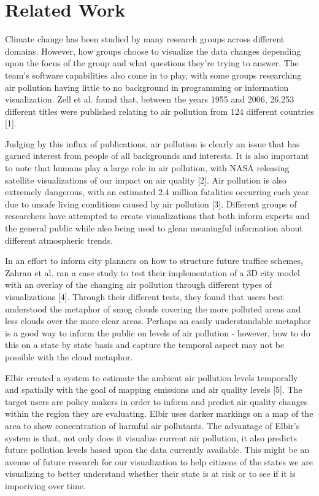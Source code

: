 \documentclass[journal]{vgtc}                %
\begin{document}
\section{Related Work}

Climate change has been studied by many research groups across different domains. However, how groups choose to visualize
the data changes depending upon the focus of the group and what questions they're trying to answer. The team's software
capabilities also come in to play, with some groups researching air pollution having little to no background in 
programming or information visualization. Zell et al. found that, between the years 1955 and 2006, 
26,253 different titles were published relating to air pollution from 124 different countries [1]. 


Judging by this influx of publications, air pollution is clearly an issue that has garned interest from people of all
backgrounds and interests. It is also important to note that humans play a large role in air pollution, with
NASA releasing satellite visualizations of our impact on air quality [2]. Air pollution is also extremely dangerous,
with an estimated 2.4 million fatalities occurring each year due to unsafe living conditions caused by air pollution [3].
Different groups of researchers have attempted to create visualizations that both inform
experts and the general public while also being used to glean meaningful information about different atmospheric trends.

In an effort to inform city planners on how to structure future traffice schemes, Zahran et al. ran a case study
to test their implementation of a 3D city model with an overlay of the changing air pollution through different types of
visualizations [4]. 
Through their different tests, they found that users best understood the metaphor of smog clouds 
covering the more polluted areas and less clouds over the more clear areas.
Perhaps an easily understandable metaphor is a good way to inform the public on levels of air pollution - however, how
to do this on a state by state basis and capture the temporal aspect may not be possible with the cloud metaphor. 

Elbir created a system to estimate the ambient air pollution levels temporally and spatially with the goal of mapping
emissions and air quality levels [5]. 
The target users are policy makers in order to inform and predict air quality changes within the region they are 
evaluating. Elbir uses darker markings on a map of the area to show concentration of harmful air pollutants.
The advantage of Elbir's system is that, not only does it visualize current air pollution, it also predicts future
pollution levels based upon the data currently available. This might be an avenue of future research for our
visualization to help citizens of the states we are visualizing to better understand whether their state is at risk or
to see if it is imporiving over time. 
\end{document}
